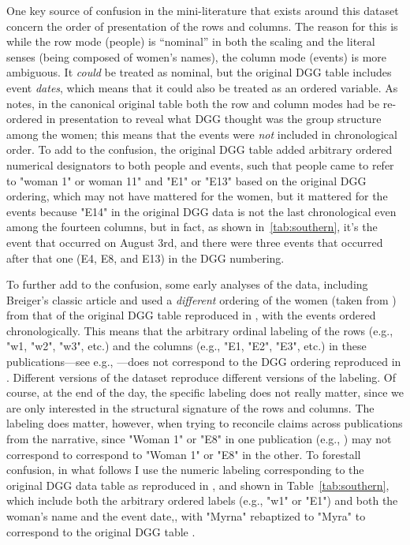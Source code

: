 \documentclass[a4paper,fleqn]{cas-sc}
\begin{document}
One key source of confusion in the mini-literature that exists around this dataset concern the order of presentation of the rows and columns. The reason for this is while the row mode (people) is ``nominal'' in both the scaling and the literal senses (being composed of women's names), the column mode (events) is more ambiguous. It \textit{could} be treated as nominal, but the original DGG table includes event \textit{dates}, which means that it could also be treated as an ordered variable.  As \citet{freeman2003finding} notes, in the canonical original table both the row and column modes had be re-ordered in presentation to reveal what DGG thought was the group structure among the women; this means that the events were \textit{not} included in chronological order. To add to the confusion, the original DGG table added arbitrary ordered numerical designators to both people and events, such that people came to refer to "woman 1" or woman 11" and "E1" or "E13" based on the original DGG ordering, which may not have mattered for the women, but it mattered for the events because "E14" in the original DGG data is not the last chronological even among the fourteen columns, but in fact, as shown in~\ref{tab:southern}, it's the event that occurred on August 3rd, and there were three events that occurred after that one (E4, E8, and E13) in the DGG numbering. 

To further add to the confusion, some early analyses of the data, including Breiger's \citeyearpar{breiger1974duality} classic article and \citet{doreian1979evolution} used a \textit{different} ordering of the women (taken from \citet{homans}) from that of the original DGG table reproduced in \citet{freeman2003finding}, with the events ordered chronologically. This means that the arbitrary ordinal labeling of the rows (e.g., "w1, "w2", "w3", etc.) and the columns (e.g., "E1, "E2", "E3", etc.) in these publications---see e.g., \citep[table 1]{doreian1979evolution}---does not correspond to the DGG ordering reproduced in \citet{freeman2003finding}. Different versions of the dataset reproduce different versions of the labeling. Of course, at the end of the day, the specific labeling does not really matter, since we are only interested in the structural signature of the rows and columns. The labeling does matter, however, when trying to reconcile claims across publications from the narrative, since "Woman 1" or "E8" in one publication (e.g., \citet{freeman2003finding}) may not correspond to correspond to "Woman 1" or "E8" in the other. To forestall confusion, in what follows I use the numeric labeling corresponding to the original DGG data table as reproduced in \citet[Figure 1]{freeman2003finding}, and shown in Table~\ref{tab:southern}, which include both the arbitrary ordered labels (e.g., "w1" or "E1") and both the woman's name and the event date,, with "Myrna" rebaptized to "Myra" to correspond to the original DGG table \citep{freeman2003finding}.
\end{document}
